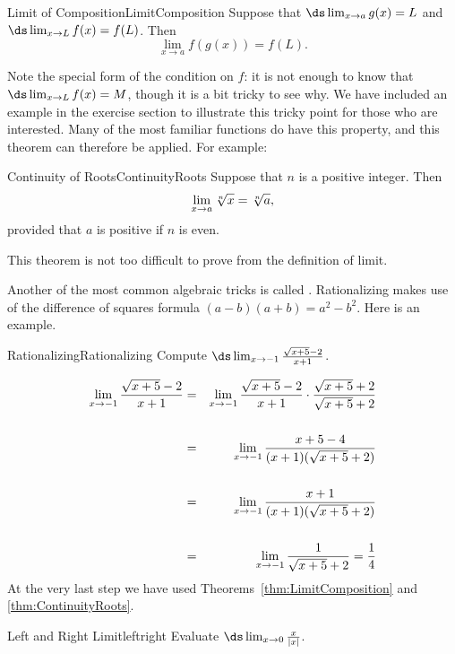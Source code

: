 \begin{theorem}{Limit of Composition}{LimitComposition}
Suppose that $\ds \lim_{x\to a}g(x)=L$ and $\ds \lim_{x\to L}f(x)=f(L)$. Then
$$\lim_{x\to a} f(g(x)) = f(L).$$
\end{theorem}

Note the special form of the condition on $f$: it is not enough to
know that $\ds\lim_{x\to L}f(x) = M$, though it is a bit tricky to see
why. We have included an example in the exercise section to illustrate this tricky
point for those who are interested. Many of the most familiar functions do have this property, and
this theorem can therefore be applied. For example:

\begin{theorem}{Continuity of Roots}{ContinuityRoots}
 Suppose that $n$ is a positive integer. Then
$$\lim_{x\to a}\root n\of{x} = \root n\of{a},$$
provided that $a$ is positive if $n$ is even.
\end{theorem}

This theorem is not too difficult to prove from the definition of limit.

Another of the most common algebraic tricks is called . 
Rationalizing makes use of the difference of squares formula $(a-b)(a+b)=a^2-b^2$.
Here is an example.

\begin{example}{Rationalizing}{Rationalizing}
Compute $\ds\lim_{x\to-1} {\sqrt{x+5}-2\over x+1}$.
\end{example}

\begin{solution} 
\begin{eqnarray*}
\lim_{x\to-1} {\sqrt{x+5}-2\over x+1}&=&
\lim_{x\to-1} {\sqrt{x+5}-2\over x+1}\cdot{\sqrt{x+5}+2\over \sqrt{x+5}+2}\cr
\\
&=&\lim_{x\to-1} {x+5-4\over (x+1)(\sqrt{x+5}+2)}\cr
\\
&=&\lim_{x\to-1} {x+1\over (x+1)(\sqrt{x+5}+2)}\cr
\\
&=&\lim_{x\to-1} {1\over \sqrt{x+5}+2}={1\over4}
\end{eqnarray*}
At the very last step we have used Theorems~\ref{thm:LimitComposition} and \ref{thm:ContinuityRoots}.
\end{solution}

\begin{example}{Left and Right Limit}{leftright}
Evaluate $\ds\lim_{x\to 0}{x\over|x|}$.
\end{example}

